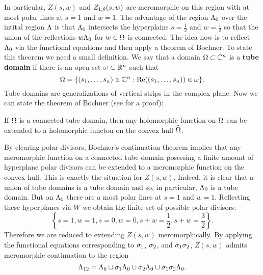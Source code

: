 \documentclass[12pt,reqno,oneside]{amsart}
\begin{document}
    In particular, $Z(s,w)$ and $Z_{1,\theta}(s,w)$ are meromorphic on this region with at most polar lines at $s = 1$ and $w = 1$. The advantage of the region $\Lambda_{0}$ over the intital region $\Lambda$ is that $\Lambda_{0}$ intersects the hyperplains $s = \frac{1}{2}$ and $w = \frac{1}{2}$ so that the union of the reflections $w\Lambda_{0}$ for $w \in \Omega$ is connected. The idea now is to reflect $\Lambda_{0}$ via the functional equations and then apply a theorem of Bochner. To state this theorem we need a small definition. We say that a domain $\Omega \subset \mathbb{C}^{n}$ is a \textbf{tube domain} if there is an open set $\omega \subset \mathbb{R}^{n}$ such that
    \[
        \Omega = \{(s_{1},\ldots,s_{n}) \in \mathbb{C}^{n}:\mathrm{Re}((s_{1},\ldots,s_{n})) \in \omega\}.
    \]
    Tube domains are generalizations of vertical strips in the complex plane. Now we can state the theorem of Bochner (see \cite{hormander2000introduction} for a proof):

    \begin{theorem}
        If $\Omega$ is a connected tube domain, then any holomorphic function on $\Omega$ can be extended to a holomorphic functon on the convex hull $\widehat{\Omega}$.
    \end{theorem}

    By clearing polar divisors, Bochner's continuation theorem implies that any meromorphic function on a connected tube domain posessing a finite amount of hyperplane polar divisors can be extended to a meromorphic function on the convex hull. This is exactly the situation for $Z(s,w)$. Indeed, it is clear that a union of tube domains is a tube domain and so, in particular, $\Lambda_{0}$ is a tube domain. But on $\Lambda_{0}$ there are a most polar lines at $s = 1$ and $w = 1$. Reflecting these hyperplanes via $W$ we obtain the finite set of possible polar divisors:
    \[
        \left\{s = 1, w = 1, s = 0, w = 0, s+w = \frac{1}{2}, s+w = \frac{3}{2}\right\}.
    \]
    Therefore we are reduced to extending $Z(s,w)$ meromorphically. By applying the functional equations corresponding to $\sigma_{1}$, $\sigma_{2}$, and $\sigma_{1}\sigma_{2}$, $Z(s,w)$ admits meromorphic continuation to the region
    \[
        \Lambda_{12} = \Lambda_{0} \cup \sigma_{1}\Lambda_{0} \cup \sigma_{2}\Lambda_{0} \cup \sigma_{1}\sigma_{2}\Lambda_{0}.
    \]
\end{document}

